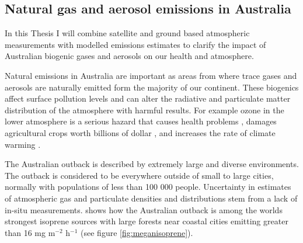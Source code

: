 \subsection{Natural gas and aerosol emissions in Australia}

In this Thesis I will combine satellite and ground based atmospheric measurements with modelled emissions estimates to clarify the impact of Australian biogenic gases and aerosols on our health and atmosphere.

Natural emissions in Australia are important as areas from where trace gases and aerosols are naturally emitted form the majority of our continent.
These biogenics affect surface pollution levels and can alter the radiative and particulate matter distribution of the atmosphere with harmful results.
For example ozone in the lower atmosphere is a serious hazard that causes health problems \cite{Hsieh_2013}, damages agricultural crops worth billions of dollar \cite{Avnery_2011}, and increases the rate of climate warming \cite{IPCC_2013_chap8}. 

The Australian outback is described by extremely large and diverse environments. 
The outback is considered to be everywhere outside of small to large cities, normally with populations of less than 100 000 people.
Uncertainty in estimates of atmospheric gas and particulate densities and distributions stem from a lack of in-situ measurements.
\citet{Guenther_2006} shows how the Australian outback is among the worlds strongest isoprene sources with large forests near coastal cities emitting greater than 16 mg m$^{-2}$ h$^{-1}$ (see figure \ref{fig:meganisoprene}).

  